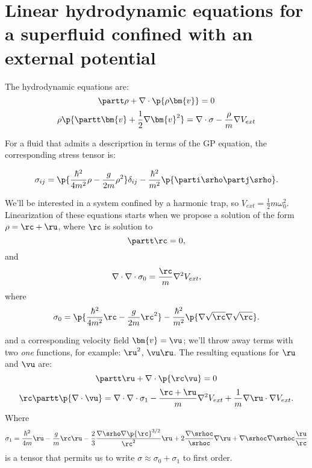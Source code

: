 \documentclass[10pt,letterpaper]{article}
\begin{document}
\section*{Linear hydrodynamic equations for a superfluid confined with an external potential}
The hydrodynamic equations are:
\begin{equation}
\partt \rho + \nabla\cdot\p{\rho\bm{v}} = 0
\label{continuity}
\end{equation}
\begin{equation}
\rho \p{ \partt \bm{v} + \frac{1}{2}\nabla \bm{v}^2 } = \nabla \cdot \sigma - \frac{\rho}{m}\nabla V_{ext}
\label{momentum}
\end{equation}

For a fluid that admits a descriprtion in terms of the GP equation, the corresponding stress tensor is:

\begin{equation}
\sigma_{ij} =
\p{\frac{\hbar^2}{4m^2} \rho - \frac{g}{2m} \rho^2}\delta_{ij} - \frac{\hbar^2}{m^2}\p{\parti\srho\partj\srho}.
\end{equation}

We'll be interested in a system confined by a harmonic trap, so $V_{ext} =	\frac{1}{2} m\omega_0^2$. Linearization of these equations starts when we propose a solution of the form $\rho = \rc + \ru$, where $\rc$ is solution to
\begin{equation}
\partt\rc = 0,
\end{equation}
and
\begin{equation}
\nabla\cdot\nabla \cdot\sigma_0 = \frac{\rc}{m}\nabla^2V_{ext},
\end{equation}
where
\begin{equation}
\sigma_{0} = \p{\frac{\hbar^2}{4m^2} \rc - \frac{g}{2m} \rc^2} - \frac{\hbar^2}{m^2}\p{\nabla\sqrt{\rc}\nabla\sqrt{\rc}}.
\end{equation}



 and a corresponding velocity field $\bm{v} = \vu$; we'll throw away terms with two \emph{one} functions, for example: $\ru^2$, $\vu\ru$. The resulting equations for $\ru$ and $\vu$ are:
\begin{equation}
\partt\ru + \nabla\cdot\p{\rc\vu} = 0
\end{equation}
\begin{equation}
\rc\partt \p{\nabla\cdot\vu} = \nabla\cdot\nabla\cdot\sigma_1 - \frac{\rc + \ru}{m}\nabla^2V_{ext} + \frac{1}{m}\nabla\ru\cdot\nabla V_{ext}.
\end{equation}
Where
\begin{equation}
\sigma_1 = \frac{\hbar^2}{4m}\ru - \frac{g}{m}\rc\ru -\frac{2}{3}\frac{\nabla\srho\nabla\p{\rc}^{3/2}}{\rc^2}\ru + 2\frac{\nabla\srhoc}{\srhoc}\nabla\ru +\nabla\srhoc\nabla\srhoc \frac{\ru}{\rc}
\end{equation}
is a tensor that permits us to write $\sigma \approx \sigma_0 + \sigma_1$ to first order.
\end{document}
